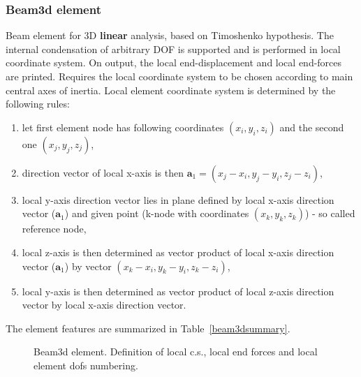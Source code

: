 \documentclass[a4paper]{article}
\begin{document}
\subsubsection{Beam3d element}
Beam element for 3D {\bf linear} analysis, based on Timoshenko hypothesis. The internal condensation
of arbitrary DOF is supported and is performed in local coordinate
system. On output, the local end-displacement and local end-forces are
printed. Requires the local coordinate system to be chosen according
to main central axes of inertia. Local element 
coordinate system is determined by the following rules:
\begin{enumerate}
\item let first element node has following coordinates $(x_i, y_i, z_i)$
and the second one $(x_j, y_j, z_j)$,
\item direction vector of local x-axis is then $\mathbf{a}_1 = (x_j-x_i, y_j-y_i, z_j-z_i)$,
\item local y-axis direction vector lies in plane defined by local
x-axis direction vector ($\mathbf{a}_1$) and given
point (k-node with coordinates $(x_k, y_k, z_k)$) - so called reference node,
\item local z-axis is then determined as vector product of local
x-axis direction vector ($\mathbf{a}_1$) by vector $(x_k-x_i, y_k-y_i, z_k-z_i)$,
\item local y-axis is then determined as vector product of local
z-axis direction vector by local x-axis direction vector. 
\end{enumerate}
The element features are summarized in Table~\ref{beam3dsummary}.
\begin{figure}[htb]
 \centering
 \begin{makeimage}
   
 \end{makeimage}
 \caption{Beam3d element. Definition of local c.s., local end forces
 and local element dofs numbering.}
 \label{beam3dfig}
\end{figure}
\end{document}
